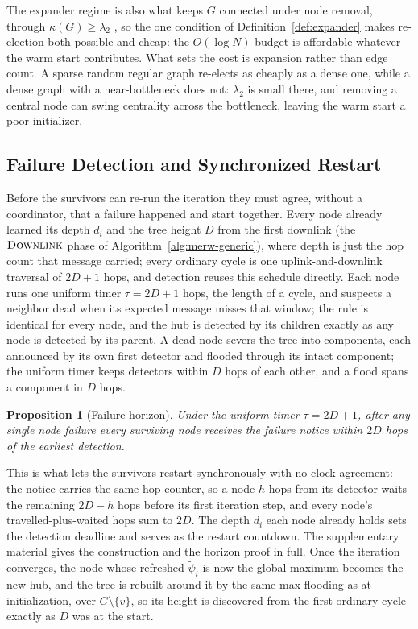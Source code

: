 \documentclass[letterpaper]{article} %
\newtheorem{proposition}{Proposition}
\begin{document}
The expander regime is also what keeps $G$ connected under node removal, through
$\kappa(G) \geq \lambda_2$ \citep{fiedler1973}, so the one condition of
Definition~\ref{def:expander} makes re-election both possible and cheap: the
$O(\log N)$ budget is affordable whatever the warm start contributes.
What sets the cost is expansion rather than edge count. A sparse random regular
graph re-elects as cheaply as a dense one, while a dense graph with a
near-bottleneck does not: $\lambda_2$ is small there, and removing a central
node can swing centrality across the bottleneck, leaving the warm start a poor
initializer.

\subsection{Failure Detection and Synchronized Restart}
\label{sec:sync}

Before the survivors can re-run the iteration they must agree, without a
coordinator, that a failure happened and start together. Every node already
learned its depth $d_i$ and the tree height $D$ from the first downlink (the
$\textsc{Downlink}$ phase of Algorithm~\ref{alg:merw-generic}), where depth is
just the hop count that message carried; every ordinary cycle is one
uplink-and-downlink traversal of $2D+1$ hops, and detection reuses this
schedule directly. Each node runs one uniform timer $\tau = 2D+1$ hops, the
length of a cycle, and suspects a neighbor dead when its expected message
misses that window; the rule is identical for every node, and the hub is
detected by its children exactly as any node is detected by its parent. A dead
node severs the tree into components, each announced by its own first detector
and flooded through its intact component; the uniform timer keeps detectors
within $D$ hops of each other, and a flood spans a component in $D$ hops.

\begin{proposition}[Failure horizon]
\label{prop:horizon}
Under the uniform timer $\tau = 2D+1$, after any single node failure every
surviving node receives the failure notice within $2D$ hops of the earliest
detection.
\end{proposition}

This is what lets the survivors restart synchronously with no clock agreement:
the notice carries the same hop counter, so a node $h$ hops from its detector
waits the remaining $2D-h$ hops before its first iteration step, and every
node's travelled-plus-waited hops sum to $2D$. The depth $d_i$ each node
already holds sets the detection deadline and serves as the restart countdown.
The supplementary material gives the construction and the horizon proof in
full. Once the iteration converges, the node whose refreshed $\tilde\psi_i$ is
now the global maximum becomes the new hub, and the tree is rebuilt around it
by the same max-flooding as at initialization, over $G\setminus\{v\}$, so its
height is discovered from the first ordinary cycle exactly as $D$ was at the
start.
\end{document}
